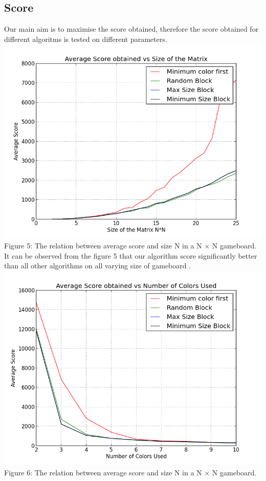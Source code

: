 \documentclass[twoside]{article}
\begin{document}
\begin{multicols}{2}
\subsection{Score}
Our main aim is to maximise the score obtained, therefore the score obtained for different algoritms is tested on different parameters.
\includegraphics[scale=0.4]{sizescore}
{\footnotesize Figure 5: The relation between average score and size N in a N $\times$ N gameboard.\\}
It can be observed from the figure 5 that our algorithm score significantly better than all other algorithms on all varying size of gameboard .
\includegraphics[scale=0.4]{colorscore}
{\footnotesize Figure 6: The relation between average score and size N in a N $\times$ N gameboard.\\}

\end{multicols}
\end{document}

